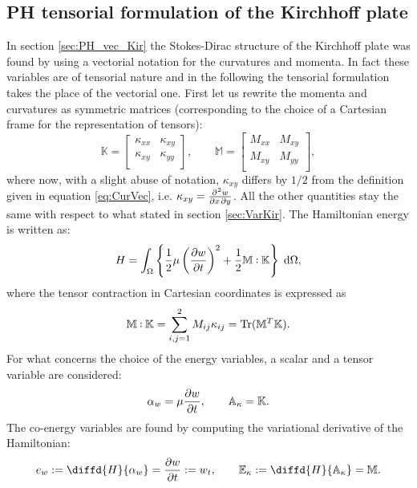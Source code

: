 \documentclass[preprint,12pt]{elsarticle}
\DeclareMathOperator{\Tr}{Tr}
\def\onedot{$\mathsurround0pt\ldotp$}
\def\cddot{%
	\mathbin{\vcenter{\baselineskip.67ex
			\hbox{\onedot}\hbox{\onedot}}%
}}
\begin{document}
\subsection{PH tensorial formulation of the Kirchhoff plate}
\label{sec:PH_ten_Kir}

In section \ref{sec:PH_vec_Kir} the Stokes-Dirac structure of the Kirchhoff plate was found by using a vectorial notation for the curvatures and momenta. {In fact} these variables are of tensorial nature and in the following the tensorial formulation takes the place of the vectorial one. First let us rewrite the momenta and curvatures as symmetric matrices (corresponding to the choice of a Cartesian frame for the representation of tensors):
\begin{equation}
\mathbb{K} = 
\begin{bmatrix}
\kappa_{xx} &  \kappa_{xy}\\
\kappa_{xy} & \kappa_{yy} \\
\end{bmatrix}, \qquad
\mathbb{M} =
\begin{bmatrix}
M_{xx} & M_{xy} \\
M_{xy} & M_{yy} \\
\end{bmatrix},
\end{equation}
where now, with a slight abuse of notation, $\kappa_{xy}$ {differs by $1/2$ from the definition given in equation \eqref{eq:CurVec}}, i.e. $\kappa_{xy} =\diffp{w}{x,y}$. All the other quantities stay the same with respect to what stated in section \ref{sec:VarKir}. The Hamiltonian energy is written as:
\begin{equation}
\label{eq:H_Kir_Ten}
H = \int_{\Omega} \left\{ \frac{1}{2} \mu \left(\diffp{w}{t} \right)^2 + \frac{1}{2} \mathbb{M} \cddot \mathbb{K}  \right\}  \d{\Omega} ,
\end{equation}
where the tensor contraction in Cartesian coordinates is expressed as
\[\mathbb{M} \cddot \mathbb{K} = \sum_{i,j = 1}^{2} M_{ij} \kappa_{ij} = \Tr(\mathbb{M}^T \mathbb{K}). \]
For what concerns the choice of the energy variables, a scalar and a tensor variable are considered:
\begin{equation}
\alpha_w = \mu \diffp{w}{t}, \qquad \mathbb{A}_{\kappa} = \mathbb{K}.	\end{equation}
The co-energy variables are found by computing the variational derivative of the Hamiltonian:
\begin{equation}
e_w := \diffd{H}{\alpha_w} = \diffp{w}{t} := w_t,  \qquad  \mathbb{E}_{\kappa} := \diffd{H}{\mathbb{A}_{\kappa}} = \mathbb{M}.
\end{equation}
\end{document}
